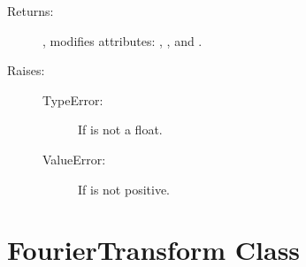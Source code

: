 \documentclass[letterpaper,10pt,english,openany,oneside]{sphinxmanual}
\begin{document}
\begin{fulllineitems}
\begin{fulllineitems}
\begin{description}
\begin{description}
\end{description}

\item[{Returns:}] \leavevmode
{}, modifies attributes: , , and
.

\item[{Raises:}] \leavevmode\begin{description}
\item[{TypeError:}] \leavevmode
If  is not a float.

\item[{ValueError:}] \leavevmode
If  is not positive.

\end{description}

\end{description}

\end{fulllineitems}


\end{fulllineitems}



\chapter{FourierTransform Class}
\label{\detokenize{index:fouriertransform-class}}
\end{document}

